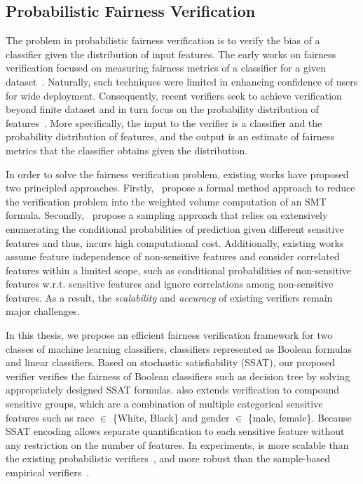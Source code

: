 \subsection*{Probabilistic Fairness Verification} The problem in probabilistic fairness verification is to verify the bias of a classifier given the distribution of input features. The early works on fairness verification focused on measuring fairness metrics of a classifier for a given dataset~\cite{aif360-oct-2018}. Naturally, such techniques were limited in enhancing confidence of users for wide deployment. Consequently, recent verifiers seek to achieve verification beyond  finite dataset and in turn focus on the  probability distribution of features~\cite{albarghouthi2017fairsquare, bastani2019probabilistic}.  More specifically, the input to the verifier is a classifier and  the probability distribution of features, and the output is an estimate of fairness metrics that the classifier obtains given the distribution.


In order to solve the fairness verification problem, existing works have proposed two principled approaches.	Firstly,~\cite{albarghouthi2017fairsquare} propose a formal method approach to reduce the verification problem into the weighted volume computation of an SMT formula. Secondly,~\cite{bastani2019probabilistic} propose a sampling approach that relies on extensively enumerating the conditional probabilities of prediction given different sensitive features and thus, incurs high computational cost. Additionally, existing works assume feature independence of non-sensitive features and consider correlated features within a limited scope, such as conditional probabilities of non-sensitive features w.r.t. sensitive features and ignore correlations among non-sensitive features. As a result, the \textit{scalability} and \textit{accuracy} of existing  verifiers remain major challenges.


In this thesis, we propose an efficient fairness verification framework for two classes of machine learning classifiers, classifiers represented as Boolean formulas and linear classifiers. Based on stochastic satisfiability (SSAT)\cite{littman2001stochastic}, our proposed verifier {\justicia} verifies the fairness of Boolean classifiers such as decision tree by solving appropriately designed SSAT formulas. {\justicia} also extends verification to compound sensitive groups, which are a combination of multiple categorical sensitive features such as race $ \in $ \{White, Black\} and gender $ \in $ \{male, female\}. Because SSAT encoding allows separate quantification to each sensitive feature without any restriction on the number of features. In experiments, {\justicia} is more scalable than the existing probabilistic verifiers~\cite{albarghouthi2017fairsquare,bastani2019probabilistic}, and more robust than the sample-based empirical verifiers~\cite{aif360-oct-2018}. 


